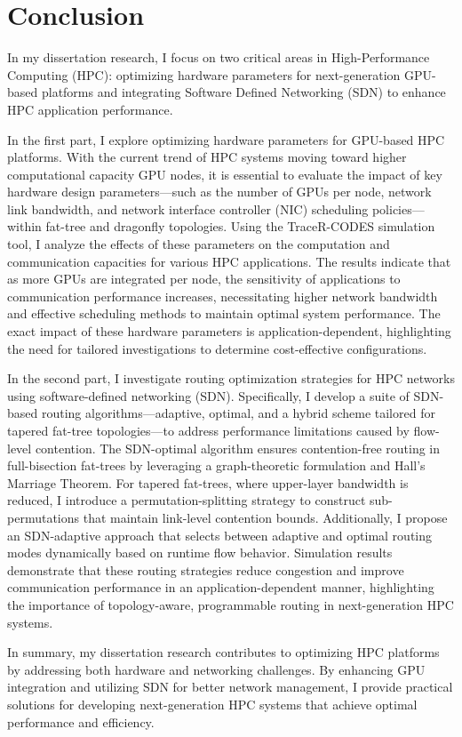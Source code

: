 \chapter{Conclusion}
In my dissertation research, I focus on two critical areas in High-Performance Computing (HPC): optimizing hardware parameters for next-generation GPU-based platforms and integrating Software Defined Networking (SDN) to enhance HPC application performance.

In the first part, I explore optimizing hardware parameters for GPU-based HPC platforms. With the current trend of HPC systems moving toward higher computational capacity GPU nodes, it is essential to evaluate the impact of key hardware design parameters—such as the number of GPUs per node, network link bandwidth, and network interface controller (NIC) scheduling policies—within fat-tree and dragonfly topologies. Using the TraceR-CODES simulation tool, I analyze the effects of these parameters on the computation and communication capacities for various HPC applications. The results indicate that as more GPUs are integrated per node, the sensitivity of applications to communication performance increases, necessitating higher network bandwidth and effective scheduling methods to maintain optimal system performance. The exact impact of these hardware parameters is application-dependent, highlighting the need for tailored investigations to determine cost-effective configurations.

In the second part, I investigate routing optimization strategies for HPC networks using software-defined networking (SDN). Specifically, I develop a suite of SDN-based routing algorithms—adaptive, optimal, and a hybrid scheme tailored for tapered fat-tree topologies—to address performance limitations caused by flow-level contention. The SDN-optimal algorithm ensures contention-free routing in full-bisection fat-trees by leveraging a graph-theoretic formulation and Hall’s Marriage Theorem. For tapered fat-trees, where upper-layer bandwidth is reduced, I introduce a permutation-splitting strategy to construct sub-permutations that maintain link-level contention bounds. Additionally, I propose an SDN-adaptive approach that selects between adaptive and optimal routing modes dynamically based on runtime flow behavior. Simulation results demonstrate that these routing strategies reduce congestion and improve communication performance in an application-dependent manner, highlighting the importance of topology-aware, programmable routing in next-generation HPC systems.

In summary, my dissertation research contributes to optimizing HPC platforms by addressing both hardware and networking challenges. By enhancing GPU integration and utilizing SDN for better network management, I provide practical solutions for developing next-generation HPC systems that achieve optimal performance and efficiency.
